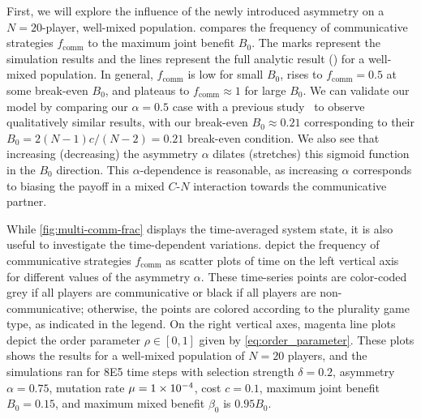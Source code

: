 \documentclass[pdflatex,lineno,referee,sn-nature]{sn-jnl}
\begin{document}
First, we will explore the influence of the newly introduced asymmetry
on a $N=20$-player, well-mixed population.
 compares the frequency of communicative strategies
$f_{\text{comm}}$ to the maximum joint benefit $B_0$.
The marks represent the simulation results
and the lines represent the full analytic
result () for a well-mixed population.
In general, $f_{\text{comm}}$ is low for small $B_0$,
rises to $f_{\text{comm}} = 0.5$ at some break-even $B_0$,
and plateaus to $f_{\text{comm}} \approx 1$ for large $B_0$.
We can validate our model by comparing our
$\alpha = 0.5$ case with a previous study~\citep{tripp2022evolutionary}
to observe qualitatively similar results,
with our break-even $B_0 \approx 0.21$
corresponding to their $B_0 = 2 (N-1) c/(N-2) = 0.21$ break-even condition.
We also see that increasing (decreasing)
the asymmetry $\alpha$ dilates (stretches) this sigmoid function
in the $B_0$ direction.
This $\alpha$-dependence is reasonable,
as increasing $\alpha$ corresponds to biasing the payoff
in a mixed $C$-$N$ interaction towards the communicative partner.

While \cref{fig:multi-comm-frac} displays
the time-averaged system state,
it is also useful to investigate the time-dependent variations.
depict the frequency
of communicative strategies $f_{\text{comm}}$
as scatter plots of time on the left vertical axis
for different values of the asymmetry $\alpha$.
These time-series points are color-coded
grey if all players are communicative or
black if all players are non-communicative;
otherwise, the points are colored according
to the plurality game type, as indicated in the legend.
On the right vertical axes,
magenta line plots depict the order parameter
$\rho \in [0,1]$
given by \cref{eq:order_parameter}.
These plots shows the results
for a well-mixed population of $N=20$ players,
and the simulations ran
for \num{8E5} time steps with
selection strength $\delta = 0.2$,
asymmetry $\alpha = 0.75$,
mutation rate $\mu=\num{1E-4}$,
cost $c = \num{0.1}$,
maximum joint benefit $B_0 = 0.15$,
and maximum mixed benefit $\beta_0$ is $\num{0.95} B_0$.
\end{document}
